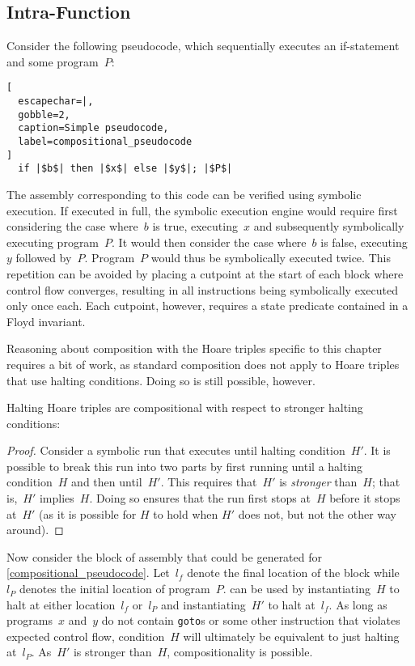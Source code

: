 \subsection{Intra-Function}
Consider the following pseudocode,
which sequentially executes an if-statement and some program~$P$:
\begin{lstlisting}[
  escapechar=|,
  gobble=2,
  caption=Simple pseudocode,
  label=compositional_pseudocode
]
  if |$b$| then |$x$| else |$y$|; |$P$|
\end{lstlisting}
The assembly corresponding to this code can be verified using symbolic execution.
If executed in full, the symbolic execution engine
would require first considering the case where~$b$ is true,
executing~$x$ and subsequently symbolically executing program~$P$.
It would then consider the case where~$b$ is false, executing~$y$ followed by~$P$.
Program~$P$ would thus be symbolically executed twice.
This repetition can be avoided
by placing a cutpoint at the start of each block where control flow converges,%
resulting in all instructions being symbolically executed only once each.
Each cutpoint, however, requires a state predicate contained in a Floyd invariant.

Reasoning about composition with the Hoare triples specific to this chapter
requires a bit of work,
as standard composition does not apply to Hoare triples
that use halting conditions.%
Doing so is still possible, however.
\begin{theorem}\label{thm:comp}
  Halting Hoare triples are compositional
  with respect to stronger halting conditions:
  \begin{prooftree}
  \end{prooftree}
\end{theorem}
\begin{proof}
  Consider a symbolic run that executes until halting condition~$H'$.
  It is possible to break this run into two parts
  by first running until a halting condition~$H$ and then until~$H'$.
  This requires that~$H'$ is \emph{stronger} than~$H$; that is,~$H'$ implies~$H$.
  Doing so ensures that the run first stops at~$H$ before it stops at~$H'$
  (as it is possible for $H$ to hold when $H'$ does not,
  but not the other way around).
\end{proof}
\begin{example}
  Now consider the block of assembly that could be generated for
  \cref{compositional_pseudocode}.
  Let~$l_f$ denote the final location of the block
  while~$l_P$ denotes the initial location of program~$P$.
   can be used by instantiating~$H$ to halt
  at either location~$l_f$ or~$l_P$ and instantiating~$H'$ to halt at~$l_f$.
  As long as programs~$x$ and~$y$ do not contain \lstinline[style=C]|goto|s
  or some other instruction that violates expected control flow,
  condition~$H$ will ultimately be equivalent to just halting at~$l_P$.
  As~$H'$ is stronger than~$H$, compositionality is possible.
\end{example}

